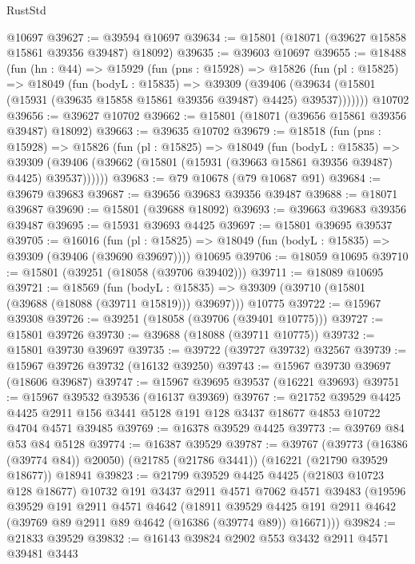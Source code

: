 \begin{lexlean}{RustStd}
\begin{coremodule}
    @10697
@39627 := @39594 @10697
@39634 := @15801 (@18071 (@39627 @15858 @15861 @39356 @39487) @18092)
@39635 := @39603 @10697
@39655 := @18488
    (fun (hn : @44) =>
    @15929
      (fun (pns : @15928) =>
      @15826
        (fun (pl : @15825) =>
        @18049
          (fun (bodyL : @15835) =>
          @39309
            (@39406
              (@39634 (@15801 (@15931 (@39635 @15858 @15861 @39356 @39487) @4425) @39537)))))))
    @10702
@39656 := @39627 @10702
@39662 := @15801 (@18071 (@39656 @15861 @39356 @39487) @18092)
@39663 := @39635 @10702
@39679 := @18518
    (fun (pns : @15928) =>
    @15826
      (fun (pl : @15825) =>
      @18049
        (fun (bodyL : @15835) =>
        @39309 (@39406 (@39662 (@15801 (@15931 (@39663 @15861 @39356 @39487) @4425) @39537))))))
@39683 := @79 @10678 (@79 @10687 @91)
@39684 := @39679 @39683
@39687 := @39656 @39683 @39356 @39487
@39688 := @18071 @39687
@39690 := @15801 (@39688 @18092)
@39693 := @39663 @39683 @39356 @39487
@39695 := @15931 @39693 @4425
@39697 := @15801 @39695 @39537
@39705 := @16016
    (fun (pl : @15825) => @18049 (fun (bodyL : @15835) => @39309 (@39406 (@39690 @39697))))
    @10695
@39706 := @18059 @10695
@39710 := @15801 (@39251 (@18058 (@39706 @39402)))
@39711 := @18089 @10695
@39721 := @18569
    (fun (bodyL : @15835) => @39309 (@39710 (@15801 (@39688 (@18088 (@39711 @15819))) @39697)))
    @10775
@39722 := @15967 @39308
@39726 := @39251 (@18058 (@39706 (@39401 @10775)))
@39727 := @15801 @39726
@39730 := @39688 (@18088 (@39711 @10775))
@39732 := @15801 @39730 @39697
@39735 := @39722 (@39727 @39732) @32567
@39739 := @15967 @39726 @39732 (@16132 @39250)
@39743 := @15967 @39730 @39697 (@18606 @39687)
@39747 := @15967 @39695 @39537 (@16221 @39693)
@39751 := @15967 @39532 @39536 (@16137 @39369)
@39767 := @21752
    @39529
    @4425
    @4425
    @2911
    @156
    @3441
    @5128
    @191
    @128
    @3437
    @18677
    @4853
    @10722
    @4704
    @4571
    @39485
@39769 := @16378 @39529 @4425
@39773 := @39769 @84 @53 @84 @5128
@39774 := @16387 @39529
@39787 := @39767
    (@39773 (@16386 (@39774 @84)) @20050)
    (@21785 (@21786 @3441))
    (@16221 (@21790 @39529 @18677))
    @18941
@39823 := @21799
    @39529
    @4425
    @4425
    (@21803 @10723 @128 @18677)
    @10732
    @191
    @3437
    @2911
    @4571
    @7062
    @4571
    @39483
    (@19596
      @39529
      @191
      @2911
      @4571
      @4642
      (@18911
        @39529
        @4425
        @191
        @2911
        @4642
        (@39769 @89 @2911 @89 @4642 (@16386 (@39774 @89)) @16671)))
@39824 := @21833 @39529
@39832 := @16143 @39824 @2902 @553 @3432 @2911 @4571 @39481 @3443

\end{coremodule}
\end{lexlean}
